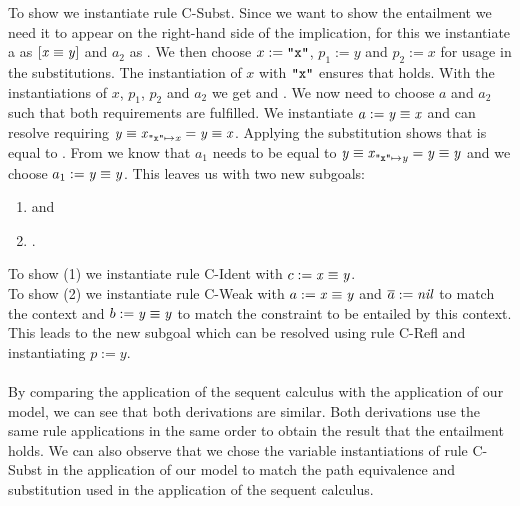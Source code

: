 \begin{example}
To show  we instantiate rule C-Subst.
Since we want to show the entailment we need it to appear on the right-hand side of the implication,
for this we instantiate \ovl a as $[\mathit{x} \equiv \mathit{y}]$ and $a_2$ as .
We then choose $x := \texttt{"x"}$, $p_1 := y$ and $p_2 := x$ for usage in the substitutions.
The instantiation of $x$ with $\texttt{"x"}$ ensures that  holds.
With the instantiations of $x$, $p_1$, $p_2$ and $a_2$ we get
 and .
We now need to choose $a$ and $a_2$ such that both  requirements are fulfilled.
We instantiate $a := \mathit{y} \equiv \mathit{x}$ and can resolve 
requiring $\mathit{\mathit{y} \equiv \mathit{x}}_{\mathit{\texttt{"x"}} \mapsto \mathit{x}} = \mathit{y} \equiv \mathit{x}$.
Applying the substitution shows that  is equal to .
From  we know that
$a_1$ needs to be equal to $\mathit{\mathit{y} \equiv \mathit{x}}_{\mathit{\texttt{"x"}} \mapsto \mathit{y}} = \mathit{y} \equiv \mathit{y}$
and we choose $a_1 := \mathit{y} \equiv \mathit{y}$.
This leaves us with two new subgoals:
\begin{enumerate}
    \item {} and
    \item {}.
\end{enumerate}
To show (1) we instantiate rule C-Ident with $c := \mathit{x} \equiv \mathit{y}$.\\
To show (2) we instantiate rule C-Weak with
$a := \mathit{x} \equiv \mathit{y}$ and $\overline{a} := \mathit{nil}$ to match the context
and $b := \mathit{y} \equiv \mathit{y}$ to match the constraint to be entailed by this context.
This leads to the new subgoal  which can be
resolved using rule C-Refl and instantiating $p := y$.\\
\\
By comparing the application of the sequent calculus with the application of our model,
we can see that both derivations are similar.
Both derivations use the same rule applications in the same order to obtain the result
that the entailment holds.
We can also observe that we chose the variable instantiations of rule C-Subst
in the application of our model to match the path equivalence and substitution used
in the application of the sequent calculus.
\end{example}

